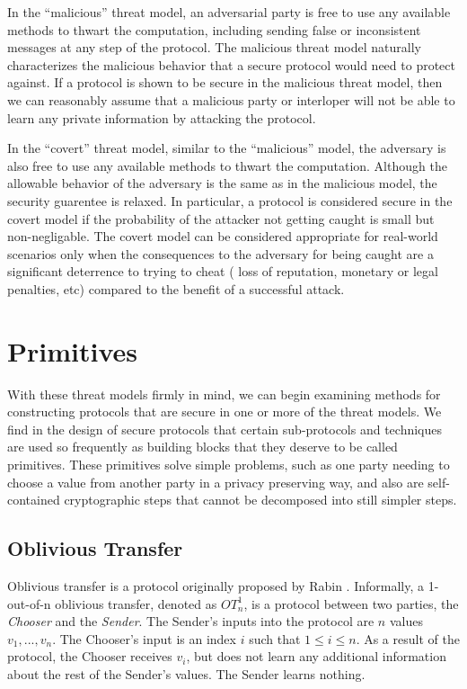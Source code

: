 In the {}``malicious'' threat model, an adversarial party is free
to use any available methods to thwart the computation, including
sending false or inconsistent messages at any step of the protocol.
The malicious threat model naturally characterizes the malicious behavior
that a secure protocol would need to protect against. If a protocol
is shown to be secure in the malicious threat model, then we can reasonably
assume that a malicious party or interloper will not be able to learn
any private information by attacking the protocol.

In the {}``covert'' threat model, similar to the {}``malicious''
model, the adversary is also free to use any available methods to
thwart the computation. Although the allowable behavior of the adversary
is the same as in the malicious model, the security guarentee is relaxed.
In particular, a protocol is considered secure in the covert model
if the probability of the attacker not getting caught is small but
non-negligable. The covert model can be considered appropriate for
real-world scenarios only when the consequences to the adversary for
being caught are a significant deterrence to trying to cheat (\ie
loss of reputation, monetary or legal penalties, etc) compared to
the benefit of a successful attack. \cite{aumannlindell}


\section{Primitives \label{sub:Primitives}}

With these threat models firmly in mind, we can begin examining methods
for constructing protocols that are secure in one or more of the threat
models. We find in the design of secure protocols that certain sub-protocols
and techniques are used so frequently as building blocks that they
deserve to be called primitives. These primitives solve simple problems,
such as one party needing to choose a value from another party in
a privacy preserving way, and also are self-contained cryptographic
steps that cannot be decomposed into still simpler steps.


\subsection{Oblivious Transfer}

Oblivious transfer is a protocol originally proposed by Rabin \cite{Rabin81}.
Informally, a 1-out-of-n oblivious transfer, denoted as $OT_{n}^{1}$,
is a protocol between two parties, the \emph{Chooser} and the \emph{Sender}.
The Sender's inputs into the protocol are $n$ values $v_{1},...,v_{n}$.
The Chooser's input is an index $i$ such that $1\le i\le n$. As
a result of the protocol, the Chooser receives $v_{i}$, but does
not learn any additional information about the rest of the Sender's
values. The Sender learns nothing.

